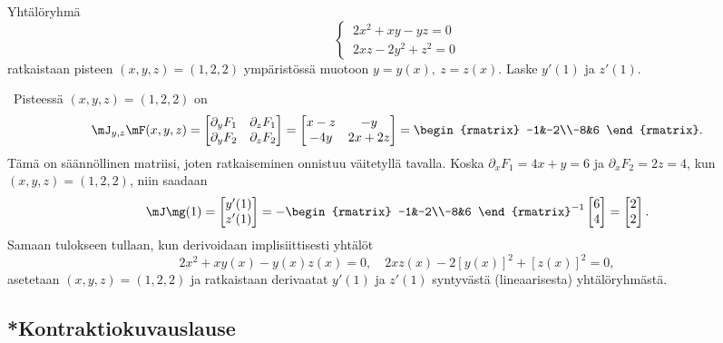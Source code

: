\begin{Exa} Yhtälöryhmä
\[
\begin{cases} \,2x^2+xy-yz=0 \\ \,2xz-2y^2+z^2=0 \end{cases}
\]
ratkaistaan pisteen $(x,y,z)=(1,2,2)$ ympäristössä muotoon $y=y(x),\ z=z(x)$. Laske
$y'(1)$ ja $z'(1)$.
\end{Exa}
\ratk \ Pisteessä $(x,y,z)=(1,2,2)$ on
\[
\mJ_{y,z}\mF(x,y,z) = \begin{bmatrix} 
                      \partial_y F_1 & \partial_z F_1 \\ \partial_y F_2 & \partial_z F_2 
                      \end{bmatrix} 
                   = \begin{bmatrix} x-z & -y \\ -4y & 2x+2z \end{bmatrix}
                   = \begin{rmatrix} -1&-2\\-8&6 \end{rmatrix}.
\]
Tämä on säännöllinen matriisi, joten ratkaiseminen onnistuu väitetyllä tavalla. Koska 
$\partial_x F_1=4x+y=6$ ja $\partial_x F_2=2z=4$, kun $(x,y,z)=(1,2,2)$, niin saadaan
\[
\mJ\mg(1)=\begin{bmatrix} y'(1)\\z'(1) \end{bmatrix}
         = -\begin{rmatrix} -1&-2\\-8&6 \end{rmatrix}^{-1} \begin{bmatrix} 6\\4 \end{bmatrix}
         = \begin{bmatrix} 2\\2 \end{bmatrix}. 
\]
Samaan tulokseen tullaan, kun derivoidaan implisiittisesti yhtälöt
\[
2x^2+xy(x)-y(x)z(x)=0, \quad 2xz(x)-2[y(x)]^2+[z(x)]^2=0,
\]
asetetaan $(x,y,z)=(1,2,2)$ ja ratkaistaan derivaatat $y'(1)$ ja $z'(1)$ syntyvästä
(lineaarisesta) yhtälöryhmästä. \loppu

\subsection{*Kontraktiokuvauslause}

